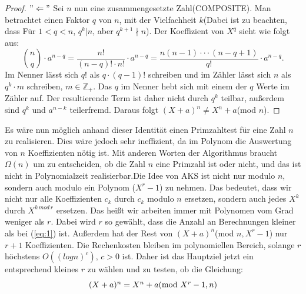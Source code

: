 \documentclass[12pt,oneside]{article}
\theoremstyle{remark}
\theoremstyle{definition}
\begin{document}
\begin{flushleft}
\begin{proof}
$"\Leftarrow"$\newline
Sei $n$ nun eine zusammengesetzte Zahl(COMPOSITE). Man betrachtet einen Faktor $q$ von $n$, mit der Vielfachheit $k$(Dabei ist zu beachten, dass Für $1 < q < n$, $q^k | n$, aber $q^{k+1} \nmid n$).\newline
Der Koeffizient von $X^q$ sieht wie folgt aus:\newline\smallskip
\begin{equation}
    {n \choose q} \cdot a^{n-q} = \frac{n!}{(n-q)! \cdot n!} \cdot a^{n-q} = \frac{n(n-1)\cdot \cdot \cdot (n-q+1)}{q!} \cdot a^{n-q}.
\end{equation}
\newline\newline
Im Nenner lässt sich $q!$ als $q \cdot (q-1)!$ schreiben und im Zähler lässt sich $n$ als $q^k\cdot m$ schreiben, $m \in \mathbb{Z}_{+}$. Das $q$ im Nenner hebt sich mit einem der $q$ Werte im Zähler auf. Der resultierende Term ist daher nicht durch $q^k$ teilbar, außerdem sind $q^k$ und $a^{n-k}$ teilerfremd. Daraus folgt $(X + a)^n \neq X^n + a $(mod $n$).
\end{proof}

Es wäre nun möglich anhand dieser Identität einen Primzahltest für eine Zahl $n$ zu realisieren. Dies wäre jedoch sehr ineffizient, da im Polynom die Auswertung von $n$ Koeffizienten nötig ist. Mit anderen Worten der Algorithmus braucht $\Omega(n)$ um zu entscheiden, ob die Zahl $n$ eine Primzahl ist oder nicht, und das ist nicht in Polynomialzeit realisierbar.\newline\newline Die Idee von AKS ist nicht nur modulo $n$, sondern auch modulo ein Polynom ($X^r -1$) zu nehmen. Das bedeutet, dass wir nicht nur alle Koeffizienten $c_{k}$ durch $c_{k}$ modulo $n$ ersetzen, sondern auch jedes $X^k$ durch $X^{k \, mod \, r}$ ersetzen. Das heißt wir arbeiten immer mit Polynomen vom Grad weniger als $r$. Dabei wird $r$ so gewählt, dass die Anzahl an Berechnungen kleiner als bei (\ref{eq:1}) ist. Außerdem hat der Rest von $(X + a)^n$(mod $ n, X^r - 1$) nur $ r + 1$ Koeffizienten. Die Rechenkosten bleiben im polynomiellen Bereich, solange $r$ höchstens $O ((log n)^c), \, c > 0$ ist. Daher ist das Hauptziel jetzt ein entsprechend kleines $r$ zu wählen und zu testen, ob die Gleichung:\newline\newline
\begin{equation}\label{eq:2}
    \centerline{$(X + a)^n = X^n + a $(mod $X^r - 1, n$)}
\end{equation}


\end{flushleft}
\end{document}
